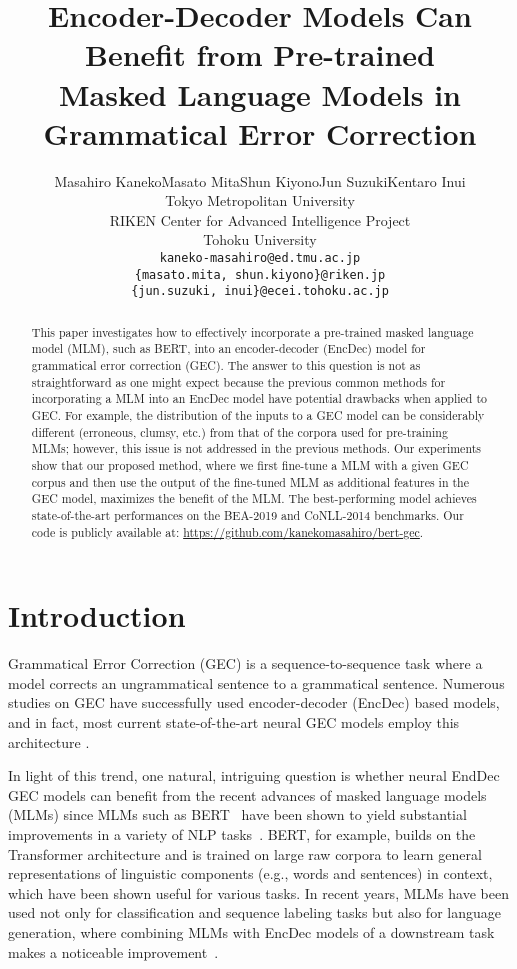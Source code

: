 \documentclass[11pt,a4paper]{article}
\title{Encoder-Decoder Models Can Benefit from Pre-trained \\ Masked Language Models in Grammatical Error Correction}
\author{Masahiro Kaneko\quad Masato Mita\quad Shun Kiyono\quad Jun Suzuki\quad Kentaro Inui \\
Tokyo Metropolitan University\\
RIKEN Center for Advanced Intelligence Project\\
Tohoku University\\
{\tt kaneko-masahiro@ed.tmu.ac.jp} \\
{\tt \{masato.mita, shun.kiyono\}@riken.jp} \\
{\tt \{jun.suzuki, inui\}@ecei.tohoku.ac.jp}}
\date{}
\begin{document}
\maketitle
\begin{abstract}

This paper investigates how to effectively incorporate a pre-trained masked language model (MLM), such as BERT, into an encoder-decoder (EncDec) model for grammatical error correction (GEC).
The answer to this question is not as straightforward as one might expect because the previous common methods for incorporating a MLM into an EncDec model have potential drawbacks when applied to GEC. 
For example, the distribution of the inputs to a GEC model can be considerably different (erroneous, clumsy, etc.) from that of the corpora used for pre-training MLMs; however, this issue is not addressed in the previous methods. 
Our experiments show that our proposed method, where we first fine-tune a MLM with a given GEC corpus and then use the output of the fine-tuned MLM as additional features in the GEC model, maximizes the benefit of the MLM.
The best-performing model achieves state-of-the-art performances on the BEA-2019 and CoNLL-2014 benchmarks.
Our code is publicly available at: \url{https://github.com/kanekomasahiro/bert-gec}.

\end{abstract}

\section{Introduction}

Grammatical Error Correction (GEC) is a sequence-to-sequence task where a model corrects an ungrammatical sentence to a grammatical sentence.
Numerous studies on GEC have successfully used encoder-decoder (EncDec) based models, and in fact, most current state-of-the-art neural GEC models employ this architecture \cite{zhao-etal-2019-improving, grundkiewicz-etal-2019-neural, kiyono-etal-2019-empirical}.


In light of this trend, one natural, intriguing question is whether neural EndDec GEC models can benefit from the recent advances of masked language models (MLMs) since MLMs such as BERT~\cite{devlin-etal-2019-bert} have been shown to yield substantial improvements in a variety of NLP tasks~\cite{Qiu2020PretrainedMF}.
BERT, for example, builds on the Transformer architecture \cite{NIPS2017_7181} and is trained on large raw corpora to learn general representations of linguistic components (e.g., words and sentences) in context, which have been shown useful for various tasks. 
In recent years, MLMs have been used not only for classification and sequence labeling tasks but also for language generation, where combining MLMs with EncDec models of a downstream task makes a noticeable improvement~\cite{lample2019cross}.
\end{document}
